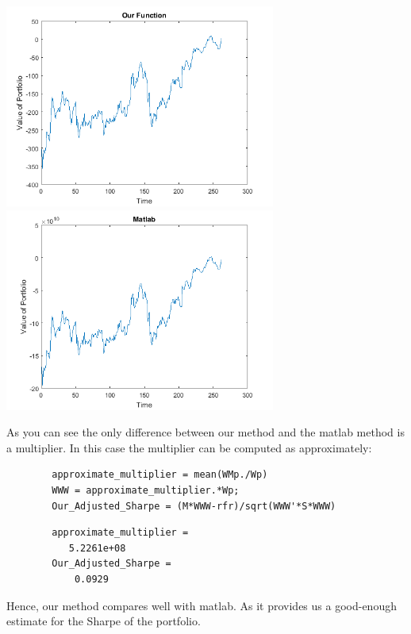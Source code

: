 \documentclass[12pt,titlepage,a4paper]{article}
\begin{document}
	\includegraphics [width=3.5in]{testing_01.png}\includegraphics [width=3.5in]{testing_02.png}
	\begin{par}
		As you can see the only difference between our method and the matlab method is a multiplier. In this case the multiplier can be computed as approximately:
	\end{par} \vspace{1em}
	\begin{verbatim}
		approximate_multiplier = mean(WMp./Wp)
		WWW = approximate_multiplier.*Wp;
		Our_Adjusted_Sharpe = (M*WWW-rfr)/sqrt(WWW'*S*WWW)
	\end{verbatim}
    \color{lightgray} \begin{verbatim}
		approximate_multiplier =
		   5.2261e+08
		Our_Adjusted_Sharpe =
		    0.0929
	\end{verbatim} \color{black}
    \begin{par}
		Hence, our method compares well with matlab. As it provides us a good-enough estimate for the Sharpe of the portfolio.
	\end{par} \vspace{1em}
\end{document}
